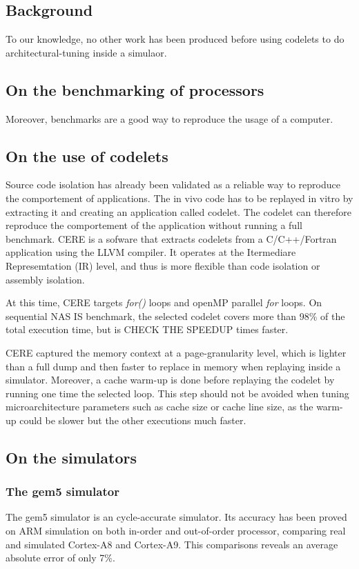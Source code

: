 \documentclass{article}
\begin{document}
\begin{multicols}{2}
\section{Background}
\label{bckgrnd}

To our knowledge, no other work has been produced before using codelets to do architectural-tuning inside a simulaor.

\subsection{On the benchmarking of processors}
Moreover, benchmarks are a good way to reproduce the usage of a computer\cite{select-bench}. %




\subsection{On the use of codelets}
Source code isolation has already been validated as a reliable way to reproduce the comportement of applications. The in vivo code has to be replayed in vitro by extracting it and creating an application called codelet\cite{code-isolation}. The codelet can therefore reproduce the comportement of the application without running a full benchmark. CERE is a sofware that extracts codelets from a C/C++/Fortran application using the LLVM compiler. It operates at the Itermediare Represemtation (IR) level, and thus is more flexible than code isolation or assembly isolation\cite{CERE}. 


At this time, CERE targets \textit{for()} loops and openMP parallel \textit{for} loops. On sequential NAS IS benchmark, the selected codelet covers more than 98\% of the total execution time, but is CHECK THE SPEEDUP times faster.


CERE captured the memory context at a page-granularity level, which is lighter than a full dump and then faster to replace in memory when replaying inside a simulator. Moreover, a cache warm-up is done before replaying the codelet by running one time the selected loop. This step should not be avoided when tuning microarchitecture parameters such as cache size or cache line size, as the warm-up could be slower but the other executions much faster.


\subsection{On the simulators}
\subsubsection*{The gem5 simulator}
The gem5 simulator is an cycle-accurate simulator. Its accuracy has been proved on ARM simulation on both in-order and out-of-order processor, comparing real and simulated Cortex-A8 and Cortex-A9\cite{DBLP:conf/samos/EndoCC14}. This comparisons reveals an average absolute error of only 7\%.


\end{multicols}
\end{document}
